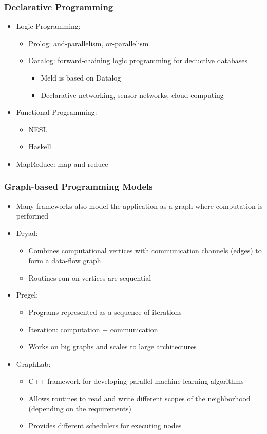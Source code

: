 \documentclass{beamer}
\begin{document}
\frame
{
   \frametitle{Declarative Programming}
   \begin{itemize}
      \item Logic Programming:
      \begin{itemize}
         \item Prolog: and-parallelism, or-parallelism
         \item Datalog: forward-chaining logic programming for deductive databases
         \begin{itemize}
            \item Meld is based on Datalog
            \item Declarative networking, sensor networks, cloud computing
         \end{itemize}
      \end{itemize}
      \item Functional Programming:
      \begin{itemize}
         \item NESL
         \item Haskell
      \end{itemize}
      \item MapReduce: map and reduce
   \end{itemize}
}

\frame
{
   \frametitle{Graph-based Programming Models}
   \begin{itemize}
      \item Many frameworks also model the application as a graph where computation is performed
      \item Dryad:
      \begin{itemize}
         \item Combines computational vertices with communication channels (edges) to form a data-flow graph
         \item Routines run on vertices are sequential
      \end{itemize}
      \item Pregel:
      \begin{itemize}
         \item Programs represented as a sequence of iterations
         \item Iteration: computation + communication
         \item Works on big graphs and scales to large architectures
      \end{itemize}
      \item GraphLab:
      \begin{itemize}
         \item C++ framework for developing parallel machine learning algorithms
         \item Allows routines to read and write different scopes of the neighborhood (depending on the requirements)
         \item Provides different schedulers for executing nodes
      \end{itemize}
   \end{itemize}
}
\end{document}
